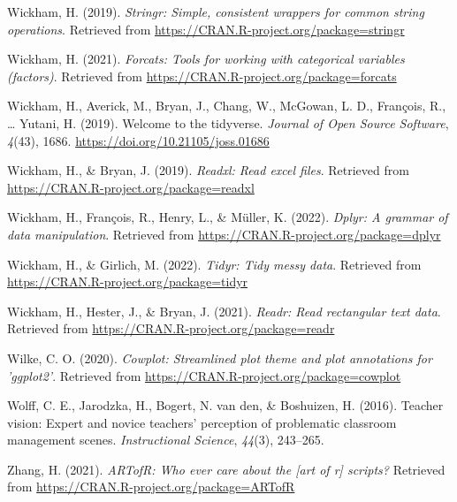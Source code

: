 \documentclass[
  man,floatsintext]{apa6}
\newlength{\cslhangindent}
\newlength{\cslentryspacingunit} %
\newenvironment{CSLReferences}[2] %
 {%
  \setlength{\parindent}{0pt}
  \ifodd #1
  \let\oldpar\par
  \def\par{\hangindent=\cslhangindent\oldpar}
  \fi
  \setlength{\parskip}{#2\cslentryspacingunit}
 }%
 {}
\begin{document}
\begin{CSLReferences}{1}{0}
\leavevmode{}%
Wickham, H. (2019). \emph{Stringr: Simple, consistent wrappers for common string operations}. Retrieved from \url{https://CRAN.R-project.org/package=stringr}

\leavevmode{}%
Wickham, H. (2021). \emph{Forcats: Tools for working with categorical variables (factors)}. Retrieved from \url{https://CRAN.R-project.org/package=forcats}

\leavevmode{}%
Wickham, H., Averick, M., Bryan, J., Chang, W., McGowan, L. D., François, R., \ldots{} Yutani, H. (2019). Welcome to the {tidyverse}. \emph{Journal of Open Source Software}, \emph{4}(43), 1686. \url{https://doi.org/10.21105/joss.01686}

\leavevmode{}%
Wickham, H., \& Bryan, J. (2019). \emph{Readxl: Read excel files}. Retrieved from \url{https://CRAN.R-project.org/package=readxl}

\leavevmode{}%
Wickham, H., François, R., Henry, L., \& Müller, K. (2022). \emph{Dplyr: A grammar of data manipulation}. Retrieved from \url{https://CRAN.R-project.org/package=dplyr}

\leavevmode{}%
Wickham, H., \& Girlich, M. (2022). \emph{Tidyr: Tidy messy data}. Retrieved from \url{https://CRAN.R-project.org/package=tidyr}

\leavevmode{}%
Wickham, H., Hester, J., \& Bryan, J. (2021). \emph{Readr: Read rectangular text data}. Retrieved from \url{https://CRAN.R-project.org/package=readr}

\leavevmode{}%
Wilke, C. O. (2020). \emph{Cowplot: Streamlined plot theme and plot annotations for 'ggplot2'}. Retrieved from \url{https://CRAN.R-project.org/package=cowplot}

\leavevmode{}%
Wolff, C. E., Jarodzka, H., Bogert, N. van den, \& Boshuizen, H. (2016). Teacher vision: Expert and novice teachers' perception of problematic classroom management scenes. \emph{Instructional Science}, \emph{44}(3), 243--265.

\leavevmode{}%
Zhang, H. (2021). \emph{ARTofR: Who ever care about the {[}art of r{]} scripts?} Retrieved from \url{https://CRAN.R-project.org/package=ARTofR}

\end{CSLReferences}

\endgroup


\clearpage
\renewcommand{\listfigurename}{Figure captions}

\clearpage
\renewcommand{\listtablename}{Table captions}
\end{document}
